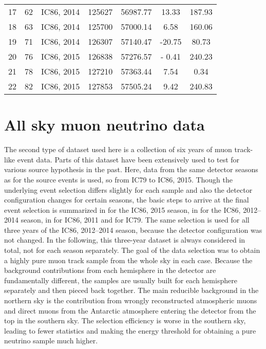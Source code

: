 \begin{table}[htbp]
\begin{tabular}{
    S[table-format =  2.0]
    S[table-format =  2.0]
    l
    S[table-format =  6.0]
    S[table-format =  5.2]
    S[table-format = -2.2]
    S[table-format =  3.2]
  }
  17 & 62 & IC86, 2014 & 125627 & 56987.77 &  13.33 & 187.93 \\
  18 & 63 & IC86, 2014 & 125700 & 57000.14 &   6.58 & 160.06 \\
  19 & 71 & IC86, 2014 & 126307 & 57140.47 & -20.75 &  80.73 \\
  20 & 76 & IC86, 2015 & 126838 & 57276.57 & - 0.41 & 240.23 \\
  21 & 78 & IC86, 2015 & 127210 & 57363.44 &   7.54 &   0.34 \\
  22 & 82 & IC86, 2015 & 127853 & 57505.24 &   9.42 & 240.83 \\
  \bottomrule
\end{tabular}
\end{table}


\section{All sky muon neutrino data}
The second type of dataset used here is a collection of six years of muon track-like event data.
Parts of this dataset have been extensively used to test for various source hypothesis in the past.
Here, data from the same detector seasons as for the source events is used, so from IC79 to IC86, 2015.
Though the underlying event selection differs slightly for each sample and also the detector configuration changes for certain seasons, the basic steps to arrive at the final event selection is summarized in  for the IC86, 2015 season, in  for the IC86, 2012--2014 season, in  for IC86, 2011 and  for IC79.
The same selection is used for all three years of the IC86, 2012--2014 season, because the detector configuration was not changed.
In the following, this three-year dataset is always considered in total, not for each season separately.
The goal of the data selection was to obtain a highly pure muon track sample from the whole sky in each case.
Because the background contributions from each hemisphere in the detector are fundamentally different, the samples are usually built for each hemisphere separately and then pieced back together.
The main reducible background in the northern sky is the contribution from wrongly reconstructed atmospheric muons and direct muons from the Antarctic atmosphere entering the detector from the top in the southern sky.
The selection efficiency is worse in the southern sky, leading to fewer statistics and making the energy threshold for obtaining a pure neutrino sample much higher.
